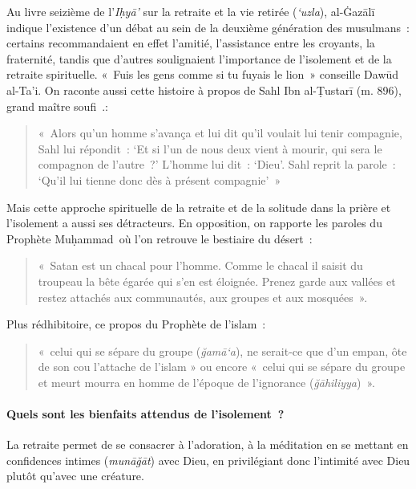 Au livre seizième de l'\emph{Iḥyā'} sur la retraite et la vie retirée
(\emph{`uzla}), al-Ġazālī \label{theol:AlGazali29} indique l'existence d'un débat au sein de la
deuxième génération des musulmans~: certains recommandaient en effet
l'amitié, l'assistance entre les croyants, la fraternité, tandis que
d'autres soulignaient l'importance de l'isolement et de la retraite
spirituelle. «~Fuis les gens comme si tu fuyais le lion~» conseille Dawūd al-Ta'i.
On raconte aussi cette histoire à propos de Sahl Ibn al-Ṭustarī (m.
896), grand maître soufi~.:
\begin{quote}
    
«~Alors qu'un homme s'avança et lui dit qu'il
voulait lui tenir compagnie, Sahl lui répondit~: `Et si l'un de nous
deux vient à mourir, qui sera le compagnon de l'autre~?' L'homme lui
dit~: `Dieu'. Sahl reprit la parole~: `Qu'il lui tienne donc dès à
présent compagnie'~»
\end{quote}

Mais cette approche spirituelle de la retraite et de la solitude dans la
prière et l'isolement a aussi ses détracteurs. En opposition, on
rapporte les paroles du Prophète Muḥammad~où l'on retrouve le bestiaire
du désert~:

\begin{quote}
«~Satan est un chacal pour l'homme. Comme le chacal il saisit du
troupeau la bête égarée qui s'en est éloignée. Prenez garde aux vallées
et restez attachés aux communautés, aux groupes et aux mosquées~».
\end{quote}

Plus rédhibitoire, ce propos du Prophète de l'islam~: 
\begin{quote}
   «~celui qui se
sépare du groupe (\emph{ğamā`a}), ne serait-ce que d'un empan, ôte de
son cou l'attache de l'islam » ou encore «~celui qui se sépare du groupe
et meurt mourra en homme de l'époque de l'ignorance
(\emph{ğāhiliyya})~». 
\end{quote}

\paragraph{Quels sont les bienfaits attendus de l'isolement~?}
La retraite permet de se consacrer à l'adoration, à la méditation en se
mettant en confidences intimes (\emph{munāğāt}) avec Dieu, en
privilégiant donc l'intimité avec Dieu plutôt qu'avec une créature.

